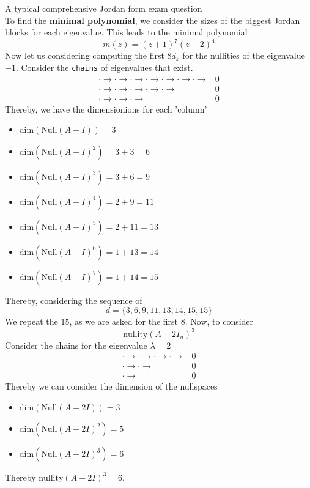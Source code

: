 \documentclass[journal, letterpaper]{IEEEtran}
\begin{document}
\begin{myboxg}{A typical comprehensive Jordan form exam question}
        \newline \\ 
        To find the \textbf{minimal polynomial}, we consider the sizes of the biggest Jordan blocks for each eigenvalue. This leads to 
        the minimal polynomial
        $$ m(z) = (z + 1)^7(z - 2)^4$$
        Now let us considering computing the first $8 d_k$ for the nullities of the eigenvalue $-1$. Consider the \verb|chains| of 
        eigenvalues that exist.
        \begin{align*}
            \cdot \to \cdot \to \cdot \to \cdot \to \cdot \to \cdot \to \cdot \to &0 \\
            \cdot \to \cdot \to \cdot \to \cdot \to \cdot \to &0 \\
            \cdot \to \cdot \to \cdot \to &0
        \end{align*}
        Thereby, we have the dimensionions for each 'column'
        \begin{itemize}
            \item $\text{dim}(\text{Null}(A + I))= 3$
            \item $\text{dim}(\text{Null}(A + I)^2) = 3 + 3 = 6$
            \item $\text{dim}(\text{Null}(A + I)^3) = 3 + 6 = 9$
            \item $\text{dim}(\text{Null}(A + I)^4) = 2 + 9 = 11$
            \item $\text{dim}(\text{Null}(A + I)^5) = 2 + 11 = 13$
            \item $\text{dim}(\text{Null}(A + I)^6)= 1 + 13 = 14$
            \item $\text{dim}(\text{Null}(A + I)^7) = 1 + 14 = 15$
        \end{itemize}
        Thereby, considering the sequence of 
        $$ d = \{3, 6, 9, 11, 13, 14, 15, 15 \}$$
        We repeat the $15$, as we are asked for the first $8$. Now, to consider
        $$ \text{nullity}(A - 2I_n)^3$$
        Consider the chains for the eigenvalue $\lambda = 2$
        \begin{align*}
            \cdot \to \cdot \to \cdot \to \cdot \to &0 \\ 
            \cdot \to \cdot \to &0 \\ 
            \cdot \to &0
        \end{align*}
        Thereby we can consider the dimension of the nullspaces 
        \begin{itemize}
            \item $\text{dim}(\text{Null}(A - 2I)) = 3$
            \item $\text{dim}(\text{Null}(A - 2I)^2) = 5$
            \item $\text{dim}(\text{Null}(A - 2I)^3) = 6$
        \end{itemize}
        Thereby $\text{nullity}(A - 2I)^3 = 6$.
    \end{myboxg}
\end{document}
